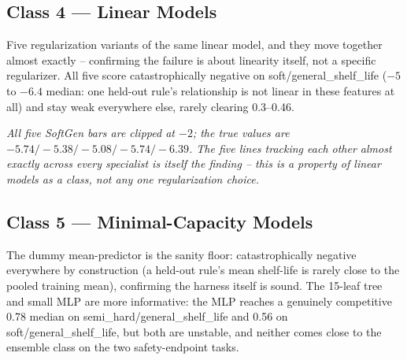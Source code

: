 \documentclass[11pt]{article}
\begin{document}
\subsection{Class 4 --- Linear Models}
Five regularization variants of the same linear model, and they move
together almost exactly -- confirming the failure is about linearity
itself, not a specific regularizer. All five score catastrophically
negative on soft/general\_shelf\_life ($-5$ to $-6.4$ median: one held-out
rule's relationship is not linear in these features at all) and stay weak
everywhere else, rarely clearing 0.3--0.46.

\begin{center}
\end{center}
\vspace{-0.3em}
\textit{All five SoftGen bars are clipped at $-2$; the true values are
$-5.74/-5.38/-5.08/-5.74/-6.39$. The five lines tracking each other almost
exactly across every specialist is itself the finding -- this is a
property of linear models as a class, not any one regularization choice.}

\subsection{Class 5 --- Minimal-Capacity Models}
The dummy mean-predictor is the sanity floor: catastrophically negative
everywhere by construction (a held-out rule's mean shelf-life is rarely
close to the pooled training mean), confirming the harness itself is
sound. The 15-leaf tree and small MLP are more informative: the MLP
reaches a genuinely competitive 0.78 median on semi\_hard/general\_shelf\_life
and 0.56 on soft/general\_shelf\_life, but both are unstable, and neither
comes close to the ensemble class on the two safety-endpoint tasks.
\end{document}
